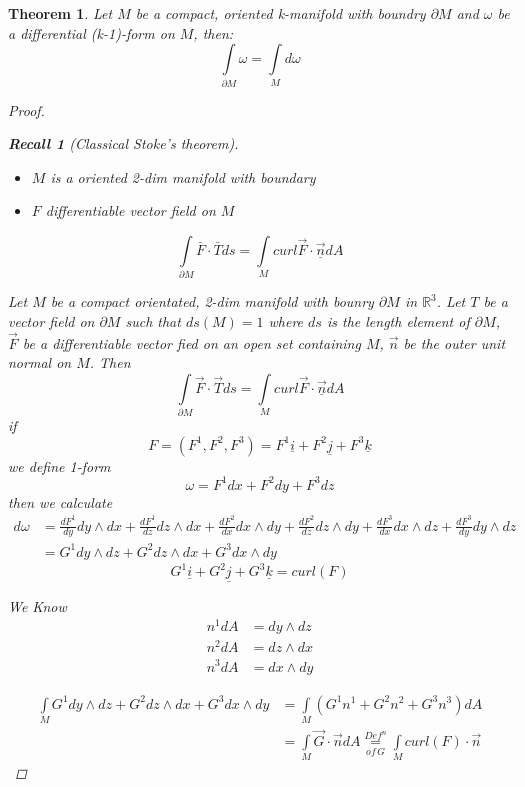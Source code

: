 \documentclass[11pt]{article}
\def\RR{\mathbb{R}}
\newtheorem{theorem}{Theorem}[section]
\newtheorem*{recall}{Recall}
\begin{document}
\begin{theorem}
Let $M$ be a compact, oriented k-manifold with boundry $\partial M$ and $\omega$ be a differential (k-1)-form on $M$, then:
\[\int\limits_{\partial M} \omega = \int\limits_{M} d\omega\]
\begin{proof}
\begin{recall}[Classical Stoke's theorem]
\begin{itemize}
\item $M$ is a oriented 2-dim manifold with boundary
\item $F$ differentiable vector field on $M$
\end{itemize}
\[\int\limits_{\partial M} \bar{F} \cdot \bar{T} ds  = \int\limits_{M} curl \vec{F} \cdot \underline{\vec{n}}dA\]
\end{recall}
Let $M$ be a compact orientated, 2-dim manifold with bounry $\partial M$ in $\RR^3$. Let $T$ be a vector field on $\partial M$ such that $ds(M) = 1$ where $ds$ is the length element of $\partial M$, $\vec{F}$ be a differentiable vector fied on an open set containing $M$, $\vec{n}$ be the outer unit normal on $M$. Then 
\[\int\limits_{\partial M} \vec{F} \cdot \vec{T} ds  = \int\limits_{M} curl \vec{F} \cdot \underline{\vec{n}}dA\]
if \[F=(F^1, F^2 , F^3) = F^1 \underline{i} + F^2 \underline{j}  + F^3 \underline{k} \]
we define 1-form \[\omega = F^1 dx + F^2 dy +F^3dz \] then we calculate 
\begin{align*}
d\omega &= \frac{dF^1}{dy} dy \wedge dx + \frac{dF^1}{dz} dz \wedge dx + \frac{dF^2}{dx} dx \wedge dy  + \frac{dF^2}{dz} dz \wedge dy + \frac{dF^3}{dx} dx \wedge dz + \frac{dF^3}{dy} dy \wedge dz \\
&= G^1 dy \wedge dz + G^2 dz \wedge dx + G^3 dx \wedge dy \end{align*}
\[G^1 \underline{i} + G^2 \underline{j}  + G^3 \underline{k} = curl (F) \]
\begin{framed} We Know
\begin{align*}
n^1dA &= dy\wedge dz\\
n^2dA &= dz\wedge dx\\
n^3dA &= dx\wedge dy
\end{align*}
\end{framed}
\begin{align*}
\int\limits_{M}   G^1 dy \wedge dz + G^2 dz \wedge dx + G^3 dx \wedge dy  & = \int\limits_{M} \left( G^1n^1 + G^2 n^2 + G^3 n^3\right) dA \\
&= \int\limits_{M} \vec{G} \cdot \vec{n} dA \underset{ of \, G}{\overset{Def^n}{=}} \int\limits_{M} curl (F) \cdot \vec{n} \end{align*}

\end{proof}
\end{theorem}
\end{document}
